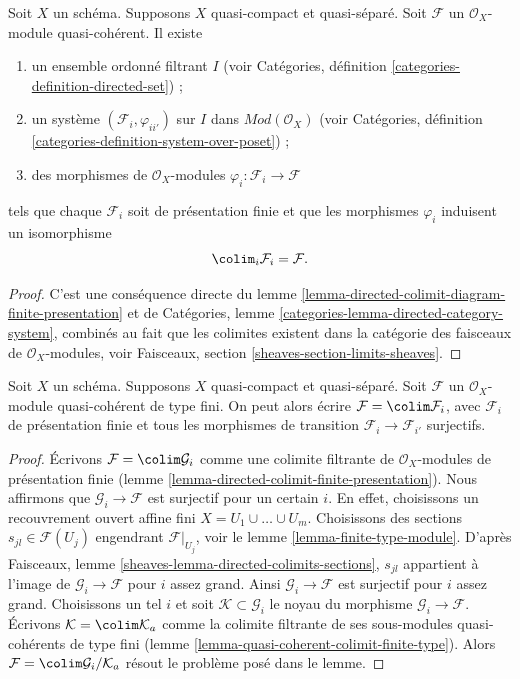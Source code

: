 \begin{lemma}
\label{lemma-directed-colimit-finite-presentation}
Soit $X$ un schéma. Supposons $X$ quasi-compact et quasi-séparé.
Soit $\mathcal{F}$ un $\mathcal{O}_X$-module quasi-cohérent.
Il existe
\begin{enumerate}
\item un ensemble ordonné filtrant $I$ (voir
Catégories, définition \ref{categories-definition-directed-set}) ;
\item un système $(\mathcal{F}_i, \varphi_{ii'})$
sur $I$ dans $\textit{Mod}(\mathcal{O}_X)$ (voir
Catégories, définition \ref{categories-definition-system-over-poset}) ;
\item des morphismes de $\mathcal{O}_X$-modules
$\varphi_i : \mathcal{F}_i \to \mathcal{F}$
\end{enumerate}
tels que chaque $\mathcal{F}_i$ soit de présentation finie
et que les morphismes $\varphi_i$ induisent un isomorphisme
$$
\colim_i \mathcal{F}_i
=
\mathcal{F}.
$$
\end{lemma}

\begin{proof}
C'est une conséquence directe du
lemme \ref{lemma-directed-colimit-diagram-finite-presentation} et de
Catégories, lemme \ref{categories-lemma-directed-category-system},
combinés au fait que
les colimites existent dans la catégorie des faisceaux de $\mathcal{O}_X$-modules, voir
Faisceaux, section \ref{sheaves-section-limits-sheaves}.
\end{proof}

\begin{lemma}
\label{lemma-finite-directed-colimit-surjective-maps}
Soit $X$ un schéma. Supposons $X$ quasi-compact et quasi-séparé.
Soit $\mathcal{F}$ un $\mathcal{O}_X$-module quasi-cohérent de type fini.
On peut alors écrire $\mathcal{F} = \colim \mathcal{F}_i$, avec $\mathcal{F}_i$
de présentation finie et tous les morphismes de transition
$\mathcal{F}_i \to \mathcal{F}_{i'}$ surjectifs.
\end{lemma}

\begin{proof}
Écrivons $\mathcal{F} = \colim \mathcal{G}_i$ comme une colimite filtrante de
$\mathcal{O}_X$-modules de présentation finie
(lemme \ref{lemma-directed-colimit-finite-presentation}).
Nous affirmons que $\mathcal{G}_i \to \mathcal{F}$ est surjectif pour un certain $i$.
En effet, choisissons un recouvrement ouvert affine fini $X = U_1 \cup \ldots \cup U_m$.
Choisissons des sections $s_{jl} \in \mathcal{F}(U_j)$ engendrant
$\mathcal{F}|_{U_j}$, voir le lemme \ref{lemma-finite-type-module}.
D'après Faisceaux, lemme \ref{sheaves-lemma-directed-colimits-sections},
$s_{jl}$ appartient à l'image de $\mathcal{G}_i \to \mathcal{F}$
pour $i$ assez grand. Ainsi $\mathcal{G}_i \to \mathcal{F}$ est surjectif
pour $i$ assez grand. Choisissons un tel $i$ et soit
$\mathcal{K} \subset \mathcal{G}_i$ le noyau du morphisme
$\mathcal{G}_i \to \mathcal{F}$. Écrivons $\mathcal{K} = \colim \mathcal{K}_a$
comme la colimite filtrante de ses sous-modules quasi-cohérents de type fini
(lemme \ref{lemma-quasi-coherent-colimit-finite-type}). Alors
$\mathcal{F} = \colim \mathcal{G}_i/\mathcal{K}_a$ résout
le problème posé dans le lemme.
\end{proof}

